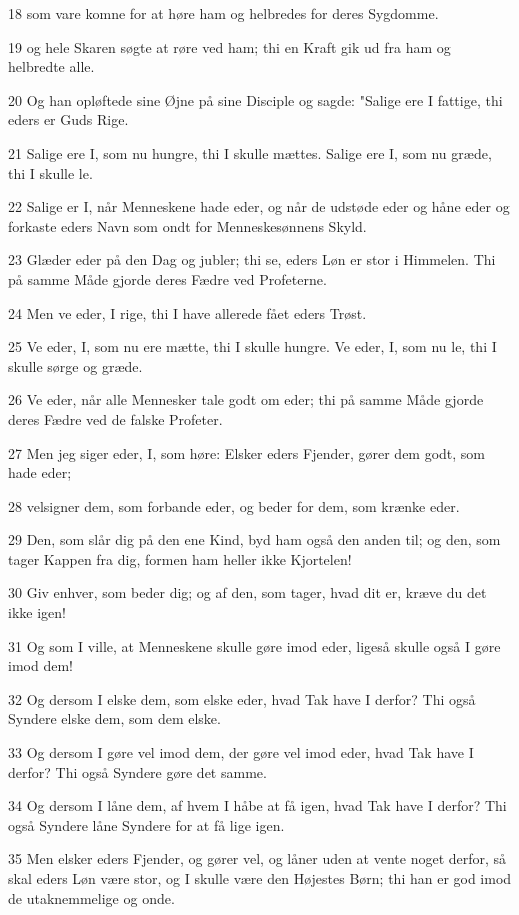 \par 18 som vare komne for at høre ham og helbredes for deres Sygdomme.
\par 19 og hele Skaren søgte at røre ved ham; thi en Kraft gik ud fra ham og helbredte alle.
\par 20 Og han opløftede sine Øjne på sine Disciple og sagde: "Salige ere I fattige, thi eders er Guds Rige.
\par 21 Salige ere I, som nu hungre, thi I skulle mættes. Salige ere I, som nu græde, thi I skulle le.
\par 22 Salige er I, når Menneskene hade eder, og når de udstøde eder og håne eder og forkaste eders Navn som ondt for Menneskesønnens Skyld.
\par 23 Glæder eder på den Dag og jubler; thi se, eders Løn er stor i Himmelen. Thi på samme Måde gjorde deres Fædre ved Profeterne.
\par 24 Men ve eder, I rige, thi I have allerede fået eders Trøst.
\par 25 Ve eder, I, som nu ere mætte, thi I skulle hungre. Ve eder, I, som nu le, thi I skulle sørge og græde.
\par 26 Ve eder, når alle Mennesker tale godt om eder; thi på samme Måde gjorde deres Fædre ved de falske Profeter.
\par 27 Men jeg siger eder, I, som høre: Elsker eders Fjender, gører dem godt, som hade eder;
\par 28 velsigner dem, som forbande eder, og beder for dem, som krænke eder.
\par 29 Den, som slår dig på den ene Kind, byd ham også den anden til; og den, som tager Kappen fra dig, formen ham heller ikke Kjortelen!
\par 30 Giv enhver, som beder dig; og af den, som tager, hvad dit er, kræve du det ikke igen!
\par 31 Og som I ville, at Menneskene skulle gøre imod eder, ligeså skulle også I gøre imod dem!
\par 32 Og dersom I elske dem, som elske eder, hvad Tak have I derfor? Thi også Syndere elske dem, som dem elske.
\par 33 Og dersom I gøre vel imod dem, der gøre vel imod eder, hvad Tak have I derfor? Thi også Syndere gøre det samme.
\par 34 Og dersom I låne dem, af hvem I håbe at få igen, hvad Tak have I derfor? Thi også Syndere låne Syndere for at få lige igen.
\par 35 Men elsker eders Fjender, og gører vel, og låner uden at vente noget derfor, så skal eders Løn være stor, og I skulle være den Højestes Børn; thi han er god imod de utaknemmelige og onde.
